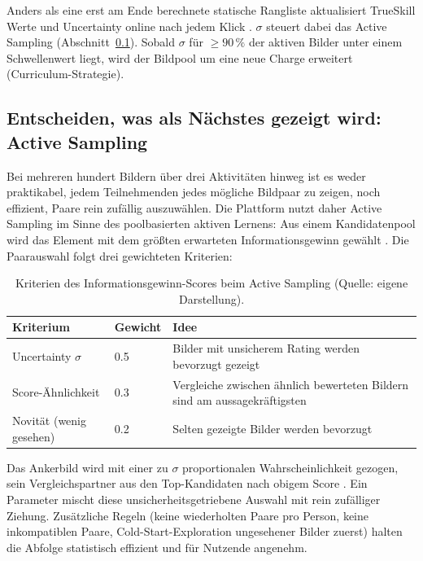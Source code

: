 \documentclass[a4paper,12pt]{article}
\begin{document}
Anders als eine erst am Ende berechnete statische Rangliste aktualisiert TrueSkill Werte und Uncertainty online nach jedem Klick \autocite{herbrich2007}. $\sigma$ steuert dabei das Active Sampling (Abschnitt~\ref{sec:active-sampling}). Sobald $\sigma$ für $\geq 90\,\%$ der aktiven Bilder unter einem Schwellenwert liegt, wird der Bildpool um eine neue Charge erweitert (Curriculum-Strategie).

\subsection{Entscheiden, was als Nächstes gezeigt wird: Active Sampling}
\label{sec:active-sampling}

Bei mehreren hundert Bildern über drei Aktivitäten hinweg ist es weder praktikabel, jedem Teilnehmenden jedes mögliche Bildpaar zu zeigen, noch effizient, Paare rein zufällig auszuwählen. Die Plattform nutzt daher Active Sampling im Sinne des poolbasierten aktiven Lernens: Aus einem Kandidatenpool wird das Element mit dem größten erwarteten Informationsgewinn gewählt \autocite{settles2009}. Die Paarauswahl folgt drei gewichteten Kriterien:

\begin{table}[h]
	\centering
	\begin{tabularx}{\textwidth}{@{}llX@{}}
		\toprule
		Kriterium & Gewicht & Idee \\
		\midrule
		Uncertainty $\sigma$ & 0.5 & Bilder mit unsicherem Rating werden bevorzugt gezeigt \\
		Score-Ähnlichkeit & 0.3 & Vergleiche zwischen ähnlich bewerteten Bildern sind am aussagekräftigsten \\
		Novität (wenig gesehen) & 0.2 & Selten gezeigte Bilder werden bevorzugt \\
		\bottomrule
	\end{tabularx}
	\caption[Kriterien des Informationsgewinn-Scores]{Kriterien des Informationsgewinn-Scores beim Active Sampling (Quelle: eigene Darstellung).}
\end{table}

Das Ankerbild wird mit einer zu $\sigma$ proportionalen Wahrscheinlichkeit gezogen, sein Vergleichspartner aus den Top-Kandidaten nach obigem Score \autocite{settles2009}. Ein Parameter mischt diese unsicherheitsgetriebene Auswahl mit rein zufälliger Ziehung. Zusätzliche Regeln (keine wiederholten Paare pro Person, keine inkompatiblen Paare, Cold-Start-Exploration ungesehener Bilder zuerst) halten die Abfolge statistisch effizient und für Nutzende angenehm.
\end{document}
